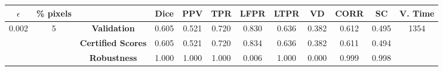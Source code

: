 \begin{longtable}{ c  c | c | c  c  c  c  c  c  c c c}
\toprule \textbf{$\epsilon$} & \textbf{\% pixels} & & \textbf{Dice} & \textbf{PPV} & \textbf{TPR} & \textbf{LFPR} & \textbf{LTPR} & \textbf{VD} & \textbf{CORR} & \textbf{SC} & \textbf{V. Time} \\
\midrule 
\multirow{3}{*}{0.002}  & \multirow{3}{*}{5} &\textbf{Validation} & 0.605 & 0.521 & 0.720 & 0.830 & 0.636 & 0.382 & 0.612 & 0.495 & \multirow{3}{*}{1354} \\
 & & \textbf{Certified Scores} & 0.605 & 0.521 & 0.720 & 0.834 & 0.636 & 0.382 & 0.611 & 0.494 & \\
& & \textbf{Robustness} & 1.000 & 1.000 & 1.000 & 0.006 & 1.000 & 0.000 & 0.999 & 0.998 & \\
\end{longtable}